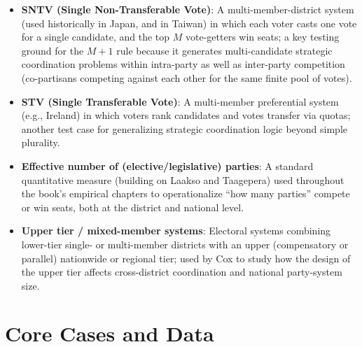 \documentclass[12pt]{article}
\begin{document}
\begin{itemize}[leftmargin=*, itemsep=4pt]
    \item \textbf{SNTV (Single Non-Transferable Vote)}: A multi-member-district system (used historically in Japan, and in Taiwan) in which each voter casts one vote for a single candidate, and the top $M$ vote-getters win seats; a key testing ground for the $M+1$ rule because it generates multi-candidate strategic coordination problems within intra-party as well as inter-party competition (co-partisans competing against each other for the same finite pool of votes).
    \item \textbf{STV (Single Transferable Vote)}: A multi-member preferential system (e.g., Ireland) in which voters rank candidates and votes transfer via quotas; another test case for generalizing strategic coordination logic beyond simple plurality.
    \item \textbf{Effective number of (elective/legislative) parties}: A standard quantitative measure (building on Laakso and Taagepera) used throughout the book's empirical chapters to operationalize ``how many parties'' compete or win seats, both at the district and national level.
    \item \textbf{Upper tier / mixed-member systems}: Electoral systems combining lower-tier single- or multi-member districts with an upper (compensatory or parallel) nationwide or regional tier; used by Cox to study how the design of the upper tier affects cross-district coordination and national party-system size.
\end{itemize}

\section{Core Cases and Data}
\end{document}
